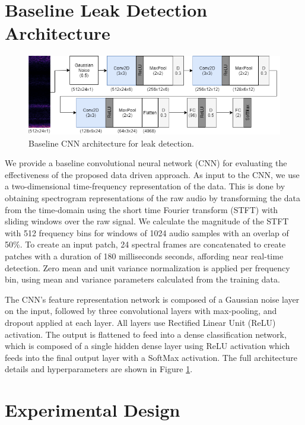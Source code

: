 \section{Baseline Leak Detection Architecture}\label{sec:baseline}

\begin{figure}[t]
	\centering
	\includegraphics[width=0.95\columnwidth]{images/cnn_flow.png}
	\caption{Baseline CNN architecture for leak detection.}
	\label{fig:cnn}
\end{figure}

We provide a baseline convolutional neural network (CNN) for evaluating the effectiveness of the proposed data driven approach. As input to the CNN, we use a two-dimensional time-frequency representation of the data. This is done by obtaining spectrogram representations of the raw audio by transforming the data from the time-domain using the short time Fourier transform (STFT) with sliding windows over the raw signal. We calculate the magnitude of the STFT with 512 frequency bins for windows of 1024 audio samples with an overlap of 50\%. To create an input patch, 24 spectral frames are concatenated to create patches with a duration of 180 milliseconds seconds, affording near real-time detection. Zero mean and unit variance normalization is applied per frequency bin, using mean and variance parameters calculated from the training data.

The CNN's feature representation network is composed of a Gaussian noise layer on the input, followed by three convolutional layers with max-pooling, and dropout applied at each layer. All layers use Rectified Linear Unit (ReLU) activation. The output is flattened to feed into a dense classification network, which is composed of a single hidden dense layer using ReLU activation which feeds into the final output layer with a SoftMax activation. The full architecture details and hyperparameters are shown in Figure \ref{fig:cnn}.

\section{Experimental Design}\label{sec:exps}

